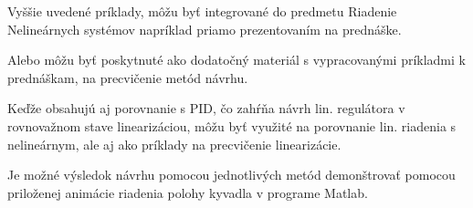 \documentclass[../main.tex]{subfiles}
\begin{document}
    Vyššie uvedené príklady, môžu byť integrované do predmetu Riadenie Nelineárnych systémov napríklad priamo prezentovaním na prednáške.

    Alebo môžu byť poskytnuté ako dodatočný materiál s vypracovanými príkladmi k prednáškam, na precvičenie metód návrhu. 

    Keďže obsahujú aj porovnanie s PID, čo zahŕňa návrh lin. regulátora v rovnovažnom stave linearizáciou, môžu byť využité na porovnanie lin. riadenia s nelineárnym, ale  aj ako príklady na precvičenie linearizácie. 

    Je možné výsledok návrhu pomocou jednotlivých metód demonštrovať pomocou priloženej animácie riadenia polohy kyvadla v programe Matlab.

\end{document}
